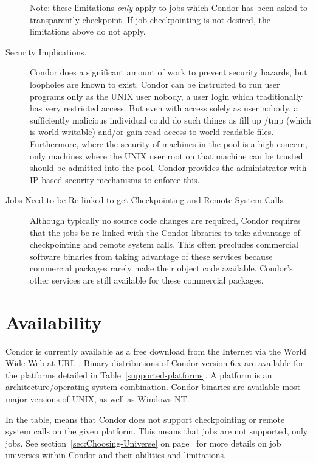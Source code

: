 \begin{description}
	Note: these limitations \emph{only} apply to jobs which Condor
has been asked to transparently checkpoint.  If job checkpointing is not
desired, the limitations above do not apply.

	\item[Security Implications.] Condor does a significant amount of work to prevent 
security hazards, but loopholes are known to exist.  Condor can be instructed 
to run user programs only as the UNIX user nobody, a user login which traditionally has very 
restricted access.  But even with access solely as user nobody, a sufficiently 
malicious individual could do such things as fill up /tmp (which is world writable) and/or gain 
read access to world readable files.
Furthermore, where the security of machines in the pool is a high concern, 
only machines where the UNIX user root on that machine can be trusted should be admitted
into the pool. Condor provides the administrator with IP-based security mechanisms 
to enforce this.

	\item[Jobs Need to be Re-linked to get Checkpointing and Remote System Calls] Although 
typically no source code changes are required,
Condor requires
that the jobs be re-linked with the Condor libraries to take
advantage of checkpointing and remote system calls. This often
precludes commercial software binaries from taking advantage of these services
because commercial packages rarely make their object code
available. 
Condor's other services are still available for these commercial packages.

\end{description}

\section{\label{sec:Availability}Availability}
Condor is currently available as a free download from the Internet via the World Wide Web at  
URL .
Binary distributions of Condor version 6.x are available for the platforms 
detailed in Table~\ref{supported-platforms}.  A platform is an 
architecture/operating system combination.  
Condor binaries are available most major versions of UNIX, as well as
Windows NT.  

In the table,  means that Condor does not support
checkpointing or remote system calls on the given platform. 
This means that  jobs are not supported, only
 jobs.
See section~\ref{sec:Choosing-Universe} on
page~\pageref{sec:Choosing-Universe} for more details on job universes
within Condor and their abilities and limitations.

